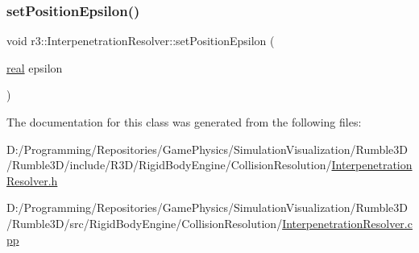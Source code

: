 \mbox{\label{classr3_1_1_interpenetration_resolver_ad70802061f5f8868622cc5024a10f8cf}} 
\subsubsection{\texorpdfstring{set\+Position\+Epsilon()}{setPositionEpsilon()}}
{\footnotesize\ttfamily void r3\+::\+Interpenetration\+Resolver\+::set\+Position\+Epsilon (\begin{DoxyParamCaption}\item[{\mbox{\hyperlink{namespacer3_ab2016b3e3f743fb735afce242f0dc1eb}{real}}}]{epsilon }\end{DoxyParamCaption})}



The documentation for this class was generated from the following files\+:\begin{DoxyCompactItemize}
\item 
D\+:/\+Programming/\+Repositories/\+Game\+Physics/\+Simulation\+Visualization/\+Rumble3\+D/\+Rumble3\+D/include/\+R3\+D/\+Rigid\+Body\+Engine/\+Collision\+Resolution/\mbox{\hyperlink{_interpenetration_resolver_8h}{Interpenetration\+Resolver.\+h}}\item 
D\+:/\+Programming/\+Repositories/\+Game\+Physics/\+Simulation\+Visualization/\+Rumble3\+D/\+Rumble3\+D/src/\+Rigid\+Body\+Engine/\+Collision\+Resolution/\mbox{\hyperlink{_interpenetration_resolver_8cpp}{Interpenetration\+Resolver.\+cpp}}\end{DoxyCompactItemize}
